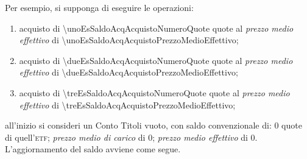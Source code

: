 \documentclass[12pt,a4paper]{article}
\newcommand{\Eur}[1]{\SI{#1}{\text{\euro{}}}}
\newcommand{\Etf}[1]{\textsc{etf}}
\begin{document}
Per esempio, si supponga di eseguire le operazioni:
\begin{enumerate}
\item acquisto di \num{\unoEsSaldoAcqAcquistoNumeroQuote} quote  al \emph{prezzo medio effettivo} di
  \Eur{\unoEsSaldoAcqAcquistoPrezzoMedioEffettivo};
\item acquisto di \num{\dueEsSaldoAcqAcquistoNumeroQuote} quote  al \emph{prezzo medio effettivo} di
  \Eur{\dueEsSaldoAcqAcquistoPrezzoMedioEffettivo};
\item acquisto di \num{\treEsSaldoAcqAcquistoNumeroQuote} quote  al \emph{prezzo medio effettivo} di
  \Eur{\treEsSaldoAcqAcquistoPrezzoMedioEffettivo};
\end{enumerate}
all'inizio  si consideri  un  Conto Titoli  vuoto,  con  saldo convenzionale  di:  \num{0} quote  di
quell'\Etf{}; \emph{prezzo  medio di carico} di  \Eur{0}; \emph{prezzo medio effettivo}  di \Eur{0}.
L'aggiornamento del saldo avviene come segue.
\end{document}
